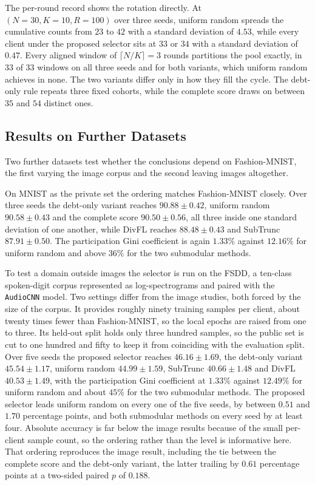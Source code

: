 \documentclass[journal]{IEEEtran}
\newcommand{\rev}[1]{#1}
\begin{document}
\rev{The per-round record shows the rotation directly. At $(N = 30, K = 10, R = 100)$ over three seeds, uniform random spreads the cumulative counts from $23$ to $42$ with a standard deviation of $4.53$, while every client under the proposed selector sits at $33$ or $34$ with a standard deviation of $0.47$. Every aligned window of $\lceil N/K \rceil = 3$ rounds partitions the pool exactly, in $33$ of $33$ windows on all three seeds and for both variants, which uniform random achieves in none. The two variants differ only in how they fill the cycle. The debt-only rule repeats three fixed cohorts, while the complete score draws on between $35$ and $54$ distinct ones.}

\subsection{Results on Further Datasets}
\label{ssec:exp-cross-dataset}

\rev{Two further datasets test whether the conclusions depend on Fashion-MNIST, the first varying the image corpus and the second leaving images altogether.}

\rev{On MNIST as the private set the ordering matches Fashion-MNIST closely. Over three seeds the debt-only variant reaches $90.88 \pm 0.42$, uniform random $90.58 \pm 0.43$ and the complete score $90.50 \pm 0.56$, all three inside one standard deviation of one another, while DivFL reaches $88.48 \pm 0.43$ and SubTrunc $87.91 \pm 0.50$. The participation Gini coefficient is again $1.33\%$ against $12.16\%$ for uniform random and above $36\%$ for the two submodular methods.}

\rev{To test a domain outside images the selector is run on the FSDD, a ten-class spoken-digit corpus represented as log-spectrograms and paired with the \texttt{AudioCNN} model. Two settings differ from the image studies, both forced by the size of the corpus. It provides roughly ninety training samples per client, about twenty times fewer than Fashion-MNIST, so the local epochs are raised from one to three. Its held-out split holds only three hundred samples, so the public set is cut to one hundred and fifty to keep it from coinciding with the evaluation split. Over five seeds the proposed selector reaches $46.16 \pm 1.69$, the debt-only variant $45.54 \pm 1.17$, uniform random $44.99 \pm 1.59$, SubTrunc $40.66 \pm 1.48$ and DivFL $40.53 \pm 1.49$, with the participation Gini coefficient at $1.33\%$ against $12.49\%$ for uniform random and about $45\%$ for the two submodular methods. The proposed selector leads uniform random on every one of the five seeds, by between $0.51$ and $1.70$ percentage points, and both submodular methods on every seed by at least four. Absolute accuracy is far below the image results because of the small per-client sample count, so the ordering rather than the level is informative here. That ordering reproduces the image result, including the tie between the complete score and the debt-only variant, the latter trailing by $0.61$ percentage points at a two-sided paired $p$ of $0.188$.}
\end{document}
